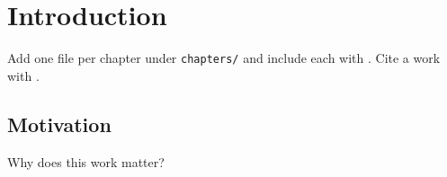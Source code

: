 \chapter{Introduction}
Add one file per chapter under \texttt{chapters/} and include each with \verb||.
Cite a work with \cite{knuth1984}.

\section{Motivation}
Why does this work matter?
